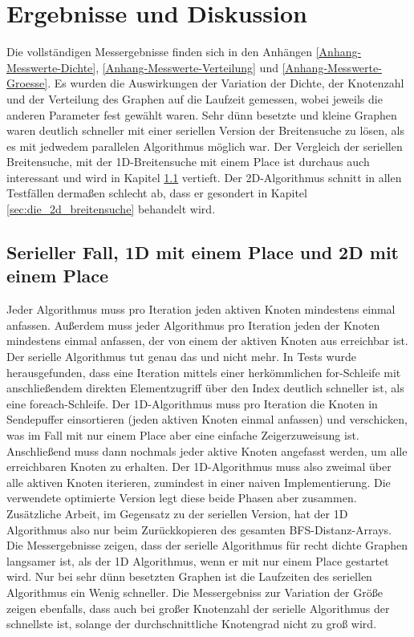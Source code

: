 \chapter{Ergebnisse und Diskussion} %
\label{cha:ergebnisse_und_diskussion}

Die vollständigen Messergebnisse finden sich in den Anhängen \ref{Anhang-Messwerte-Dichte}, \ref{Anhang-Messwerte-Verteilung} und \ref{Anhang-Messwerte-Groesse}. Es wurden die Auswirkungen der Variation der Dichte, der Knotenzahl und der Verteilung des Graphen auf die Laufzeit gemessen, wobei jeweils die anderen Parameter fest gewählt waren. Sehr dünn besetzte und kleine Graphen waren deutlich schneller mit einer seriellen Version der Breitensuche zu lösen, als es mit jedwedem parallelen Algorithmus möglich war. Der Vergleich der seriellen Breitensuche, mit der 1D-Breitensuche mit einem Place ist durchaus auch interessant und wird in Kapitel \ref{sec:serieller_fall_vs_1d_mit_einem_place} vertieft. Der 2D-Algorithmus schnitt in allen Testfällen dermaßen schlecht ab, dass er gesondert in Kapitel \ref{sec:die_2d_breitensuche} behandelt wird.

\section{Serieller Fall, 1D mit einem Place und 2D mit einem Place} %
\label{sec:serieller_fall_vs_1d_mit_einem_place}
Jeder Algorithmus muss pro Iteration jeden aktiven Knoten mindestens einmal anfassen. Außerdem muss jeder Algorithmus pro Iteration jeden der Knoten mindestens einmal anfassen, der von einem der aktiven Knoten aus erreichbar ist. Der serielle Algorithmus tut genau das und nicht mehr. In Tests wurde herausgefunden, dass eine Iteration mittels einer herkömmlichen for-Schleife mit anschließendem direkten Elementzugriff über den Index deutlich schneller ist, als eine foreach-Schleife. Der 1D-Algorithmus muss pro Iteration die Knoten in Sendepuffer einsortieren (jeden aktiven Knoten einmal anfassen) und verschicken, was im Fall mit nur einem Place aber eine einfache Zeigerzuweisung ist. Anschließend muss dann nochmals jeder aktive Knoten angefasst werden, um alle erreichbaren Knoten zu erhalten. Der 1D-Algorithmus muss also zweimal über alle aktiven Knoten iterieren, zumindest in einer naiven Implementierung. Die verwendete optimierte Version legt diese beide Phasen aber zusammen. Zusätzliche Arbeit, im Gegensatz zu der seriellen Version, hat der 1D Algorithmus also nur beim Zurückkopieren des gesamten BFS-Distanz-Arrays. Die Messergebnisse zeigen, dass der serielle Algorithmus für recht dichte Graphen langsamer ist, als der 1D Algorithmus, wenn er mit nur einem Place gestartet wird. Nur bei sehr dünn besetzten Graphen ist die Laufzeiten des seriellen Algorithmus ein Wenig schneller. Die Messergebniss zur Variation der Größe zeigen ebenfalls, dass auch bei großer Knotenzahl der serielle Algorithmus der schnellste ist, solange der durchschnittliche Knotengrad nicht zu groß wird.

